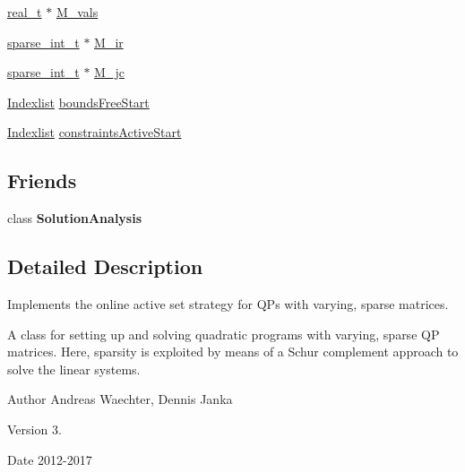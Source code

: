 \begin{DoxyCompactItemize}
\item 
\hyperlink{qp_o_a_s_e_s__wrapper_8h_a0d00e2b3dfadee81331bbb39068570c4}{real\+\_\+t} $\ast$ \hyperlink{class_s_q_problem_schur_a2de9d718635c4a0195d9778c4694d268}{M\+\_\+vals}
\item 
\hyperlink{_types_8hpp_aa5432b00c9081e2d62d7f38c32e4ed80}{sparse\+\_\+int\+\_\+t} $\ast$ \hyperlink{class_s_q_problem_schur_a6c737312815c2b622c3be4245c71b6d1}{M\+\_\+ir}
\item 
\hyperlink{_types_8hpp_aa5432b00c9081e2d62d7f38c32e4ed80}{sparse\+\_\+int\+\_\+t} $\ast$ \hyperlink{class_s_q_problem_schur_a75e1d2d567b4a62f3cc509d6bbad13e8}{M\+\_\+jc}
\item 
\hyperlink{class_indexlist}{Indexlist} \hyperlink{class_s_q_problem_schur_a93a583e326b93672fb8cd4ff1b8d3465}{bounds\+Free\+Start}
\item 
\hyperlink{class_indexlist}{Indexlist} \hyperlink{class_s_q_problem_schur_af5e96d7c752ee66527f37925b429f191}{constraints\+Active\+Start}
\end{DoxyCompactItemize}
\subsection*{Friends}
\begin{DoxyCompactItemize}
\item 
\mbox{\label{class_s_q_problem_schur_ab55a166adacbc90da27a86b0010c81d7}} 
class {\bfseries Solution\+Analysis}
\end{DoxyCompactItemize}


\subsection{Detailed Description}
Implements the online active set strategy for Q\+Ps with varying, sparse matrices. 

A class for setting up and solving quadratic programs with varying, sparse QP matrices. Here, sparsity is exploited by means of a Schur complement approach to solve the linear systems.

\begin{DoxyAuthor}{Author}
Andreas Waechter, Dennis Janka 
\end{DoxyAuthor}
\begin{DoxyVersion}{Version}
3. 
\end{DoxyVersion}
\begin{DoxyDate}{Date}
2012-\/2017 
\end{DoxyDate}


